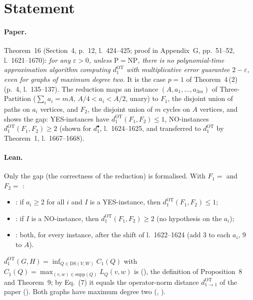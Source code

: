 

\paperversion

\section{Statement}

\paragraph{Paper.} Theorem~16 (Section~4, p.~12, l.~424--425; proof in Appendix~G, pp.~51--52,
l.~1621--1670): \emph{for any $\varepsilon>0$, unless $\mathrm{P}=\mathrm{NP}$, there is no polynomial-time
approximation algorithm computing $d^{\mathrm{OT}}_1$ with multiplicative error guarantee $2-\varepsilon$, even
for graphs of maximum degree two.} It is the case $p=1$ of Theorem~4\,(2) (p.~4, l.~135--137). The reduction maps an
instance $(A,a_1,\dots,a_{3m})$ of Three-Partition ($\sum_ia_i=mA$, $A/4<a_i<A/2$, unary) to $F_1$, the
disjoint union of paths on $a_i$ vertices, and $F_2$, the disjoint union of $m$ cycles on $A$ vertices,
and shows the gap: YES-instances have $d^{\mathrm{OT}}_1(F_1,F_2)\le1$, NO-instances
$d^{\mathrm{OT}}_1(F_1,F_2)\ge2$ (shown for $d^{\bullet}_1$, l.~1624--1625, and transferred to
$d^{\mathrm{OT}}_1$ by Theorem~1, l.~1667--1668).

\paragraph{Lean.} Only the gap (the correctness of the reduction) is formalised. With
$F_1=$  and $F_2=$ :
\begin{itemize}
\item {}: if $a_i\ge2$ for all $i$ and $I$ is a
  YES-instance, then $d^{\mathrm{OT}}_1(F_1,F_2)\le1$;
\item {}: if $I$ is a NO-instance, then
  $d^{\mathrm{OT}}_1(F_1,F_2)\ge2$ (no hypothesis on the $a_i$);
\item {}: both, for every instance, after the shift
  of l.~1622--1624 (add $3$ to each $a_i$, $9$ to $A$).
\end{itemize}
$d^{\mathrm{OT}}_1(G,H)=\inf_{Q\in\mathrm{DS}(V,W)}C_1(Q)$ with $C_1(Q)=\max_{(v,w)\in\mathrm{supp}(Q)}L_Q(v,w)$
is  (), the definition of Proposition~8 and Theorem~9; by
Eq.~(7) it equals the operator-norm distance $d^{\mathrm{OT}}_{1\to1}$ of the paper
(). Both graphs have maximum degree two
(, ).

